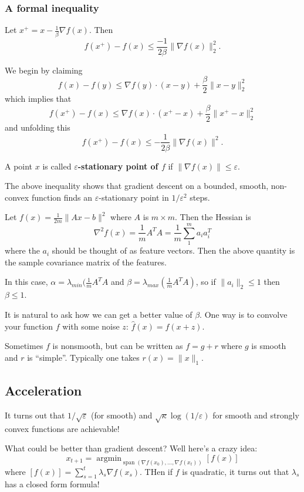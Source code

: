 \documentclass[12pt]{article}
\DeclareMathOperator*{\argmin}{argmin}
\newcommand{\grad}{\nabla}
\begin{document}
\subsubsection{A formal inequality}
\begin{prop}
	Let $x^+=x-\frac{1}{\beta}\nabla f(x)$. Then 
	\[f(x^+)-f(x)\le\frac{-1}{2\beta}\|\nabla f(x)\|_2^2.\]
\end{prop}
\begin{prf}
	We begin by claiming 
	\[f(x)-f(y)\le\nabla f(y)\cdot(x-y)+\frac{\beta}{2}\|x-y\|_2^2\]
	which implies that 
	\[f(x^+)-f(x)\le\grad f(x)\cdot(x^+-x)+\frac{\beta}{2}\|x^+-x\|_2^2\]
	and unfolding this 
	\[f(x^+)-f(x)\le-\frac{1}{2\beta}\|\nabla f(x)\|^2.\]
\end{prf}
\begin{defn}
	A point $x$ is called \textbf{$\varepsilon$-stationary point of $f$} if $\|\grad f(x)\|\le \varepsilon$.
\end{defn}
\begin{rmk}
	The above inequality shows that gradient descent on a bounded, smooth, non-convex function finds an $\varepsilon$-stationary point in $1/\varepsilon^2$ steps.
\end{rmk}
\begin{ex}
	Let $f(x)=\frac{1}{2m}\|Ax-b\|^2$ where $A$ is $m\times m$. Then the Hessian is 
	\[\grad^2 f(x)=\frac{1}{m}A^TA=\frac{1}{m}\sum_1^ma_ia_i^T\]
	where the $a_i$ should be thought of as feature vectors. Then the above quantity is the sample covariance matrix of the features.

	In this case, $\alpha=\lambda_{min}(\frac{1}{m}A^TA$ and $\beta=\lambda_{max}(\frac{1}{m}A^TA)$, so if $\|a_i\|_2\le 1$ then $\beta\le 1$.
\end{ex}
\begin{rmk}
	It is natural to ask how we can get a better value of $\beta.$ One way is to convolve your function $f$ with some noise $z$: $\hat f(x)=f(x+z)$.

	Sometimes $f$ is nonsmooth, but can be written as $f=g+r$ where $g$ is smooth and $r$ is ``simple''. Typically one takes $r(x)=\|x\|_1$.
\end{rmk}
\subsection{Acceleration}
It turns out that $1/\sqrt{\varepsilon}$ (for smooth) and $\sqrt{\kappa}\log(1/\varepsilon)$ for smooth and strongly convex functions are achievable!

What could be better than gradient descent? Well here's a crazy idea:
\[x_{t+1}=\argmin_{\operatorname{span}(\grad f(x_0),\dots,\grad f(x_t))}[f(x)]\]
where $[f(x)]=\sum_{s=1}^t\lambda_s\grad f(x_s)$. THen if $f$ is quadratic, it turns out that $\lambda_s$ has a closed form formula!
\end{document}
